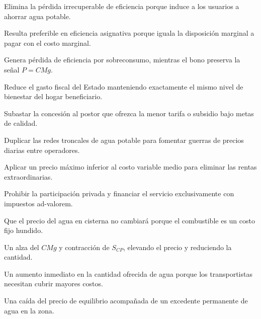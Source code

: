 \begin{opts}
    \item Elimina la pérdida irrecuperable de eficiencia porque induce a los usuarios a ahorrar agua potable.
    \item Resulta preferible en eficiencia asignativa porque iguala la disposición marginal a pagar con el costo marginal.
    \item Genera pérdida de eficiencia por sobreconsumo, mientras el bono preserva la señal $P = CMg$.
    \item Reduce el gasto fiscal del Estado manteniendo exactamente el mismo nivel de bienestar del hogar beneficiario.
\end{opts}

\begin{opts}
    \item Subastar la concesión al postor que ofrezca la menor tarifa o subsidio bajo metas de calidad.
    \item Duplicar las redes troncales de agua potable para fomentar guerras de precios diarias entre operadores.
    \item Aplicar un precio máximo inferior al costo variable medio para eliminar las rentas extraordinarias.
    \item Prohibir la participación privada y financiar el servicio exclusivamente con impuestos ad-valorem.
\end{opts}

\begin{opts}
    \item Que el precio del agua en cisterna no cambiará porque el combustible es un costo fijo hundido.
    \item Un alza del $CMg$ y contracción de $S_{CP}$, elevando el precio y reduciendo la cantidad.
    \item Un aumento inmediato en la cantidad ofrecida de agua porque los transportistas necesitan cubrir mayores costos.
    \item Una caída del precio de equilibrio acompañada de un excedente permanente de agua en la zona.
\end{opts}

